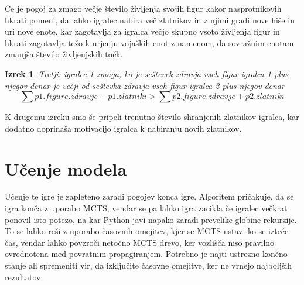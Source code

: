 \documentclass[a4paper, 12pt]{book}
\newtheorem{izrek}{Izrek}[chapter]
\begin{document}
Če je pogoj za zmago večje število življenja svojih figur kakor nasprotnikovih hkrati pomeni, da lahko igralec nabira več zlatnikov in z njimi gradi nove hiše in uri nove enote, kar zagotavlja za igralca večjo skupno vsoto življenja figur in hkrati zagotavlja težo k urjenju vojaških enot z namenom, da sovražnim enotam zmanjša število življenjskih točk.

\begin{izrek}
	\label{ustavitvenipogoj3}
Tretji: igralec 1 zmaga, ko je seštevek zdravja vseh figur igralca 1 plus njegov denar je večji od seštevka zdravja vseh figur igralca 2 plus njegov denar
	\begin{equation}
	\sum{p1.figure.zdravje} + p1.zlatniki > \sum{p2.figure.zdravje} + p2.zlatniki
	\label{eq:ustavitvenipogoj3}
	\end{equation}
\end{izrek}

K drugemu izreku smo še pripeli trenutno število shranjenih zlatnikov igralca, kar dodatno doprinaša motivacijo igralca k nabiranju novih zlatnikov.


\chapter{Učenje modela}
\label{chucenjemodela}

Učenje te igre je zapleteno zaradi pogojev konca igre. 
Algoritem pričakuje, da se igra konča z uporabo MCTS, vendar se pa lahko igra zacikla če igralec večkrat ponovil isto potezo, na kar Python javi napako zaradi prevelike globine rekurzije.
To se lahko reši z uporabo časovnih omejitev, kjer se MCTS ustavi ko se izteče čas, vendar lahko povzroči netočno MCTS drevo, ker vozlišča niso pravilno ovrednotena med povratnim propagiranjem.
Potrebno je najti ustrezno končno stanje ali spremeniti vir, da izključite časovne omejitve, ker ne vrnejo najboljših rezultatov.
\end{document}
